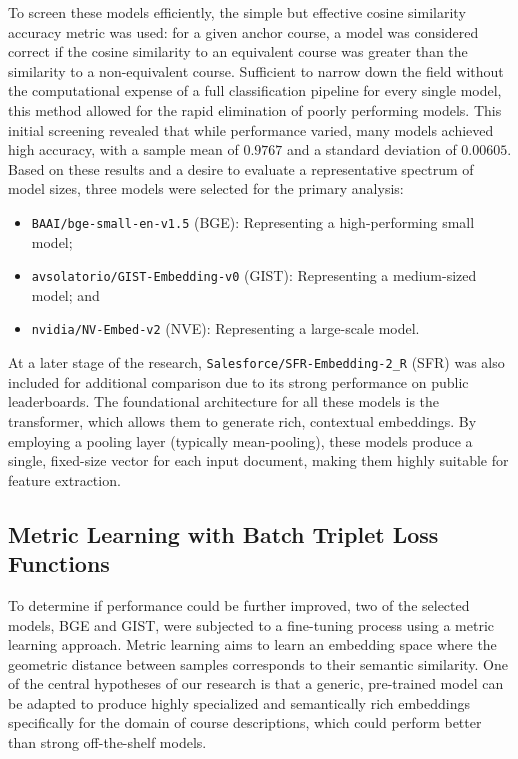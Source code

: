 To screen these models efficiently, the simple but effective cosine similarity accuracy metric was used: for a given anchor course, a model was considered correct if the cosine similarity to an equivalent course was greater than the similarity to a non-equivalent course. Sufficient to narrow down the field without the computational expense of a full classification pipeline for every single model, this method allowed for the rapid elimination of poorly performing models. This initial screening revealed that while performance varied, many models achieved high accuracy, with a sample mean of \(0.9767\) and a standard deviation of \(0.00605\). Based on these results and a desire to evaluate a representative spectrum of model sizes, three models were selected for the primary analysis:
\begin{itemize}
    \item \verb|BAAI/bge-small-en-v1.5| (BGE): Representing a high-performing small model;
    \item \verb|avsolatorio/GIST-Embedding-v0| (GIST): Representing a medium-sized model; and
    \item \verb|nvidia/NV-Embed-v2| (NVE): Representing a large-scale model.
\end{itemize}

At a later stage of the research, \verb|Salesforce/SFR-Embedding-2_R| (SFR) was also included for additional comparison due to its strong performance on public leaderboards. The foundational architecture for all these models is the transformer, which allows them to generate rich, contextual embeddings. By employing a pooling layer (typically mean-pooling), these models produce a single, fixed-size vector for each input document, making them highly suitable for feature extraction.

\subsection{Metric Learning with Batch Triplet Loss Functions}
To determine if performance could be further improved, two of the selected models, BGE and GIST, were subjected to a fine-tuning process using a metric learning approach. Metric learning aims to learn an embedding space where the geometric distance between samples corresponds to their semantic similarity.  One of the central hypotheses of our research is that a generic, pre-trained model can be adapted to produce highly specialized and semantically rich embeddings specifically for the domain of course descriptions, which could perform better than strong off-the-shelf models.


